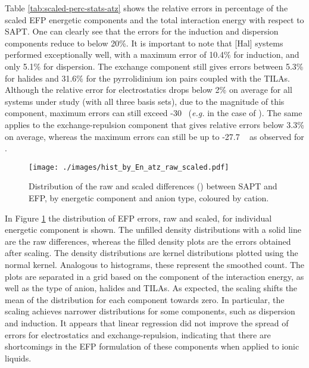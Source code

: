 Table \ref{tab:scaled-perc-stats-atz} shows the relative errors in percentage of the scaled EFP energetic components and the total interaction energy with respect to SAPT.
One can clearly see that the errors for the induction and dispersion components reduce to below 20\%.
It is important to note that [Hal] systems performed exceptionally well, with a maximum error of 10.4\% for induction, and only 5.1\% for dispersion.
The exchange component still gives errors between 5.3\% for  halides and 31.6\% for the pyrrolidinium ion pairs coupled with the TILAs.
Although the relative error for electrostatics drops below 2\% on average for all systems under study (with all three basis sets), due to the magnitude of this component, maximum errors can still exceed -30 \enUnit~(\emph{e.g.} in the case of ).
The same applies to the exchange-repulsion component that gives relative errors below 3.3\% on average, whereas the maximum errors can still be up to -27.7 \enUnit~ as observed for .


\begin{figure}[h]
    \caption{Distribution of the raw and scaled differences (\enUnit) between SAPT and EFP, by energetic component and anion type, coloured by cation.}
    \label{fig:hist-raw-scaled-atz}
    \centering
    \texttt{[image: ./images/hist\_by\_En\_atz\_raw\_scaled.pdf]}
\end{figure}


In Figure \ref{fig:hist-raw-scaled-atz} the distribution of EFP errors, raw and scaled, for individual energetic component is shown.
The unfilled density distributions with a solid line are the raw differences, whereas the filled density plots are the errors obtained after scaling.
The density distributions are kernel distributions plotted using the normal kernel.
Analogous to histograms, these represent the smoothed count.
The plots are separated in a grid based on the component of the interaction energy, as well as the type of anion, halides and TILAs.
As expected, the scaling shifts the mean of the distribution for each component towards zero.
In particular, the scaling achieves narrower distributions for some components, such as dispersion and induction.
It appears that linear regression did not improve the spread of errors for electrostatics and exchange-repulsion, indicating that there are shortcomings in the EFP formulation of these components when applied to ionic liquids.


